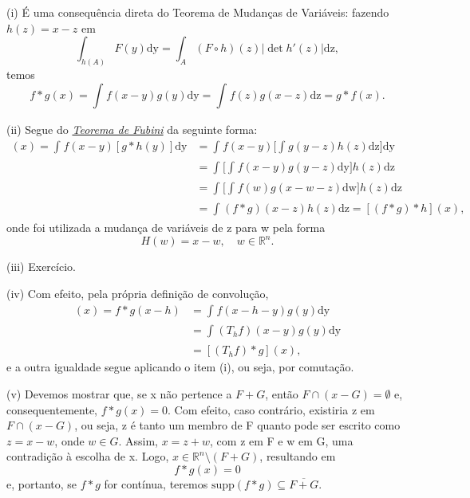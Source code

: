 \documentclass[../distribution_theory_notes.tex]{subfiles}
\begin{document}
\begin{proof*}
	(i) É uma consequência direta do Teorema de Mudanças de Variáveis: fazendo \(h(z)=x-z\) em
	\[
		\int_{h(A)}^{}F(y) \mathrm{dy}=\int_{A}^{}(F\circ h)(z) |\det{h'(z)}|\mathrm{dz},
	\]
	temos
	\[
		f*g(x)=\int_{}^{}f(x-y)g(y) \mathrm{dy} = \int_{}^{}f(z)g(x-z) \mathrm{dz}=g*f(x).
	\]

	(ii) Segue do \hyperlink{fubini_tonelli}{\textit{Teorema de Fubini}} da seguinte forma:
	\begin{align*}
		[f*(g*h)](x) = \int_{}^{}f(x-y)[g*h(y)] \mathrm{dy} & = \int_{}^{}f(x-y)\biggl[\int_{}^{}g(y-z)h(z) \mathrm{dz}\biggr] \mathrm{dy} \\
		                                                    & = \int_{}^{}\biggl[\int_{}^{}f(x-y)g(y-z) \mathrm{dy}\biggr] h(z)\mathrm{dz} \\
		                                                    & = \int_{}^{}\biggl[\int_{}^{}f(w)g(x-w-z) \mathrm{dw}\biggr]h(z) \mathrm{dz} \\
		                                                    & = \int_{}^{}(f*g)(x-z)h(z) \mathrm{dz}  = [(f*g)*h](x),
	\end{align*}
	onde foi utilizada a mudança de variáveis de z para w pela forma
	\[
		H(w)=x-w,\quad w\in \mathbb{R}^{n}.
	\]

	(iii) Exercício.

	(iv) Com efeito, pela própria definição de convolução,
	\begin{align*}
		[T_h(f*g)](x)=f*g(x-h) & = \int_{}^{}f(x-h-y)g(y) \mathrm{dy}    \\
		                       & = \int_{}^{}(T_hf)(x-y)g(y) \mathrm{dy} \\
		                       & = [(T_hf)*g](x),
	\end{align*}
	e a outra igualdade segue aplicando o item (i), ou seja, por comutação.

	(v) Devemos mostrar que, se x não pertence a \(F+G\), então \(F\cap (x-G)=\emptyset \) e, consequentemente, \(f*g(x)=0\). Com efeito, caso contrário, existiria z em \(F\cap (x-G)\), ou seja, z é tanto um membro de F quanto pode ser escrito como \(z=x-w\), onde \(w\in G\). Assim, \(x=z+w\), com z em F e w em G, uma contradição à escolha de x. Logo, \(x\in \mathbb{R}^{n}\setminus{(F+G)}\), resultando em
	\[
		f*g(x)=0
	\]
	e, portanto, se \(f*g\) for contínua, teremos \(\mathrm{supp}(f*g)\subseteq \overline{F+G}.\) \qedsymbol
\end{proof*}
\end{document}
